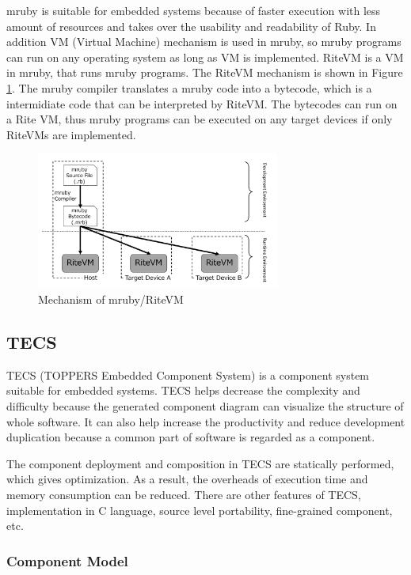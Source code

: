 \documentclass[conference,compsoc]{IEEEtran}
\begin{document}
mruby is suitable for embedded systems because of faster execution with less amount of resources and takes over the usability and readability of Ruby.
In addition VM (Virtual Machine) mechanism is used in mruby, so mruby programs can run on any operating system as long as VM is implemented.
RiteVM is a VM in mruby, that runs mruby programs.
The RiteVM mechanism is shown in Figure \ref{fig:mruby}.
The mruby compiler translates a mruby code into a bytecode, which is a intermidiate code that can be interpreted by RiteVM.
The bytecodes can run on a Rite VM, thus mruby programs can be executed on any target devices if only RiteVMs are implemented.
\begin{figure}[t]
    \centering
    \includegraphics[width=8cm,clip]{figure/mruby.pdf}
    \caption{Mechanism of mruby/RiteVM}
    \label{fig:mruby}
\end{figure}

\subsection{TECS}
\label{sec:TECS}
TECS (TOPPERS Embedded Component System) is a component system suitable for embedded systems.
TECS helps decrease the complexity and difficulty because the generated component diagram can visualize the structure of whole software.
It can also help increase the productivity and reduce development duplication  because a common part of software is regarded as a component.

The component deployment and composition in TECS are statically performed, which gives optimization.
As a result, the overheads of execution time and memory consumption can be reduced.
There are other features of TECS, implementation in C language, source level portability, fine-grained component, etc.

\subsubsection{Component Model}\mbox{}\\
\end{document}
